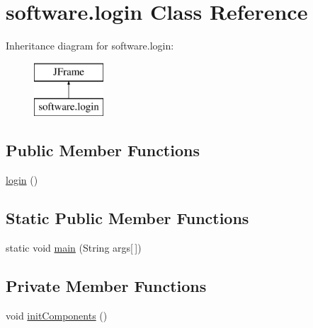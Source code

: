 \hypertarget{classsoftware_1_1login}{}\section{software.\+login Class Reference}
\label{classsoftware_1_1login}
Inheritance diagram for software.\+login\+:\begin{figure}[H]
\begin{center}
\leavevmode
\includegraphics[height=2.000000cm]{classsoftware_1_1login}
\end{center}
\end{figure}
\subsection*{Public Member Functions}
\begin{DoxyCompactItemize}
\item 
\mbox{\hyperlink{classsoftware_1_1login_a2169a57b945dc943e960524f043745cc}{login}} ()
\end{DoxyCompactItemize}
\subsection*{Static Public Member Functions}
\begin{DoxyCompactItemize}
\item 
static void \mbox{\hyperlink{classsoftware_1_1login_a132b836b18cdd0a247477d646f9bb496}{main}} (String args\mbox{[}$\,$\mbox{]})
\end{DoxyCompactItemize}
\subsection*{Private Member Functions}
\begin{DoxyCompactItemize}
\item 
void \mbox{\hyperlink{classsoftware_1_1login_ac84cdac0e8dc0bb818680b78d1ff1241}{init\+Components}} ()
\end{DoxyCompactItemize}
